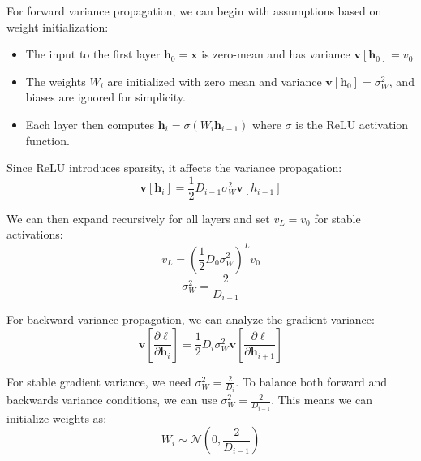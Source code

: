 \documentclass{article}
\begin{document}
{\color{blue}
For forward variance propagation, we can begin with assumptions based on weight initialization:
\begin{itemize}
    \item The input to the first layer $\textbf{h}_0= \textbf{x}$ is zero-mean and has variance $\textbf{v}[\textbf{h}_0]= v_0$
    \item The weights $W_i$ are initialized with zero mean and variance $\textbf{v}[\textbf{h}_0]= \sigma_W^2$, and biases are ignored for simplicity. 
    \item Each layer then computes $\textbf{h}_i= \sigma(W_i \textbf{h}_{i-1})$ where $\sigma$ is the ReLU activation function.
\end{itemize}

Since ReLU introduces sparsity, it affects the variance propagation:
\begin{equation}
    \textbf{v}[\textbf{h}_i]= \frac{1}{2} D_{i-1} \sigma_W^2 \textbf{v}[h_{i-1}]
\end{equation}

We can then expand recursively for all layers and set $v_L=v_0$ for stable activations:
\begin{equation}
    v_L= \left(\frac{1}{2} D_0 \sigma_W^2 \right)^L v_0
\end{equation}
\begin{equation}
    \sigma_W^2= \frac{2}{D_{i-1}}
\end{equation}

For backward variance propagation, we can analyze the gradient variance:
\begin{equation}
    \textbf{v}\left[\frac{\partial \ell}{\partial \textbf{h}_i}\right]= \frac{1}{2} D_i \sigma_W^2 \textbf{v}\left[\frac{\partial \ell}{\partial \textbf{h}_{i+1}}\right]
\end{equation}

For stable gradient variance, we need $\sigma_W^2= \frac{2}{D_i}$. To balance both forward and backwards variance conditions, we can use $\sigma_W^2= \frac{2}{D_{i-1}}$. This means we can initialize weights as:
\begin{equation}
    W_i \sim \mathcal{N} \left(0, \frac{2}{D_{i-1}} \right)
\end{equation}
}
\end{document}
